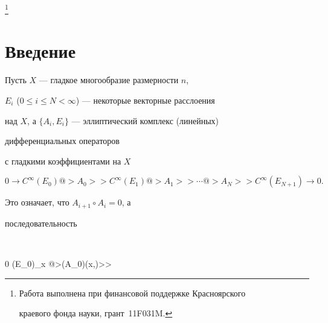 \thanks{Работа выполнена при финансовой поддержке Красноярского


краевого фонда науки, грант \No\,11F031M.}





\date{}




\pagestyle{plain} %







\maketitle


\label{begin}











\section*{Введение}


\label{S.0}





Пусть $X$ --- гладкое многообразие размерности $n$,


$E_i$ ($0\leq i \leq N<\infty$) --- некоторые векторные расслоения 


над $X$, а $\{ A_i, E_i\}$ --- эллиптический комплекс (линейных)


дифференциальных операторов


с гладкими коэффициентами на $X$


\begin{equation}\label{eq.3.3.4}


0 \to C^\infty (E_0) @>{A_0}>>


C^\infty (E_1) @>{A_1}>> \dotsb @>{A_N}>>


C^\infty (E_{N+1}) \to 0.


\end{equation}


Это означает, что $A_{i+1} \circ A_i=0$, а


последовательность


$$


0 \to (E_{0})_x @>{\sigma (A_0)(x,\zeta)}>>


